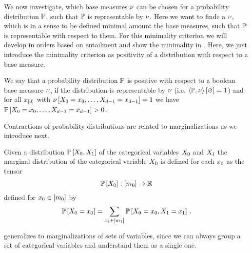 We now investigate, which base measures $\nu$ can be chosen for a probability distribution $\mathbb{P}$, such that $\mathbb{P}$ is representable by $\nu$.
Here we want to finde a $\nu$, which is in a sense to be defined minimal amount the base measures, such that $\mathbb{P}$ is representable with respect to them.
For this minimality criterion we will develop in  orders based on entailment and show the minimality in .
Here, we just introduce the minimality criterion as positivity of a distribution with respect to a base measure.

\begin{definition}\label{def:positivityBaseMeasure}
	We say that a probability distribution $\mathbb{P}$ is positive with respect to a boolean base measure $\nu$, if the distribution is representable by $\nu$ (i.e. $\left\langle \mathbb{P},\nu\right\rangle \left[ \varnothing \right]=1$) and for all $x_{[d]}$ with $\nu\left[X_{0}=x_{0},\ldots,X_{d-1}=x_{d-1}\right]=1$ we have $\mathbb{P}\left[X_{0}=x_{0},\ldots,X_{d-1}=x_{d-1}\right]>0$.
\end{definition}




Contractions of probability distributions are related to marginalizations as we introduce next.

\begin{definition}\label{def:marginalProbability}
	Given a distribution $\mathbb{P}\left[X_{0},X_{1}\right]$ of the categorical variables $X_{0}$ and $X_{1}$ the marginal distribution of the categorical variable $X_{0}$ is defined for each $x_{0}$ as the tensor
	\begin{align*}
		\mathbb{P}\left[X_{0}\right] : [m_{0}] \rightarrow \mathbb{R}
	\end{align*}
	defined for $x_{0}\in[m_{0}]$ by
	\begin{align*}
		\mathbb{P}\left[X_{0}=x_{0}\right] 
		= \sum_{x_{1}\in[m_{1}]} \mathbb{P}\left[X_{0}=x_{0},X_{1}=x_{1}\right] \, .
	\end{align*}
\end{definition}

 generalizes to marginalizations of sets of variables, since we can always group a set of categorical variables and understand them as a single one.

